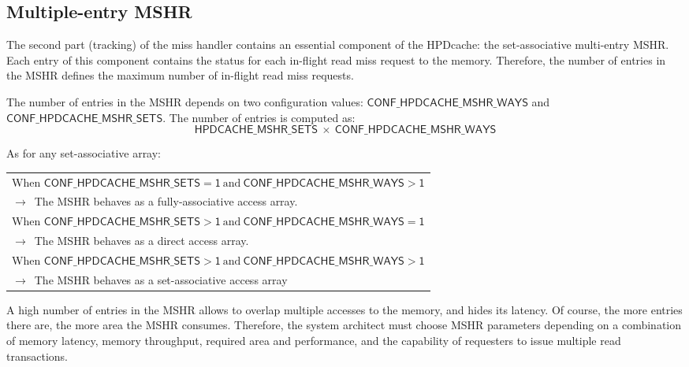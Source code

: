 \documentclass[10pt,titlepage,twoside]{book}
\begin{document}


\subsection{Multiple-entry \acf*{MSHR}}

The second part (tracking) of the miss handler contains an essential component of the \ac{HPDcache}: the set-associative multi-entry \ac{MSHR}.
Each entry of this component contains the status for each in-flight read miss request to the memory.
Therefore, the number of entries in the \ac{MSHR} defines the maximum number of in-flight read miss requests.

The number of entries in the \ac{MSHR} depends on two configuration values: $\mathsf{CONF\_HPDCACHE\_MSHR\_WAYS}$ and $\mathsf{CONF\_HPDCACHE\_MSHR\_SETS}$.
The number of entries is computed as:
\begin{equation*}
\mathsf{HPDCACHE\_MSHR\_SETS~\times~CONF\_HPDCACHE\_MSHR\_WAYS}
\end{equation*}

As for any set-associative array:

\begin{tabular}{p{\linewidth}}
    \toprule
    When $\mathsf{CONF\_HPDCACHE\_MSHR\_SETS = 1}~\text{and}~\mathsf{CONF\_HPDCACHE\_MSHR\_WAYS > 1}$\\
    $\rightarrow$~The \ac{MSHR} behaves as a fully-associative access array.\\
    \midrule
    When $\mathsf{CONF\_HPDCACHE\_MSHR\_SETS > 1}~\text{and}~\mathsf{CONF\_HPDCACHE\_MSHR\_WAYS = 1}$\\
    $\rightarrow$~The \ac{MSHR} behaves as a direct access array.\\
    \midrule
    When $\mathsf{CONF\_HPDCACHE\_MSHR\_SETS > 1}~\text{and}~\mathsf{CONF\_HPDCACHE\_MSHR\_WAYS > 1}$\\
    $\rightarrow$~The \ac{MSHR} behaves as a set-associative access array\\
\end{tabular}

A high number of entries in the \ac{MSHR} allows to overlap multiple accesses to the memory, and hides its latency.
Of course, the more entries there are, the more area the \ac{MSHR} consumes.
Therefore, the system architect must choose \ac{MSHR} parameters depending on a combination of memory latency, memory throughput, required area and performance, and the capability of requesters to issue multiple read transactions.
\end{document}
